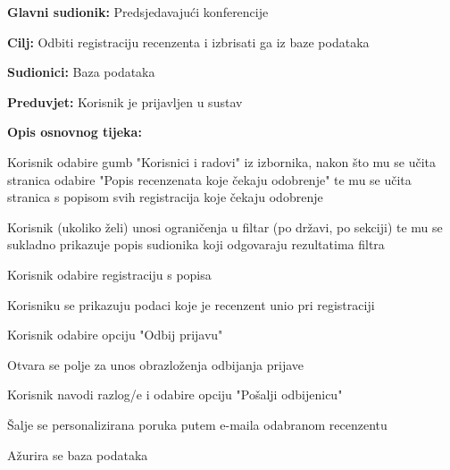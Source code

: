 					\noindent {}
					\begin{packed_item}
	
						\item \textbf{Glavni sudionik: } Predsjedavajući konferencije
						\item  \textbf{Cilj:} Odbiti registraciju recenzenta i izbrisati ga iz baze podataka
						\item  \textbf{Sudionici:} Baza podataka
						\item  \textbf{Preduvjet:} Korisnik je prijavljen u sustav
						\item  \textbf{Opis osnovnog tijeka:}
						
						\item[] \begin{packed_enum}

							\item Korisnik odabire gumb "Korisnici i radovi" iz izbornika, nakon što mu se učita stranica odabire "Popis recenzenata koje čekaju odobrenje" te mu se učita stranica s popisom svih registracija koje čekaju odobrenje
							\item Korisnik (ukoliko želi) unosi ograničenja u filtar (po državi, po sekciji) te mu se sukladno prikazuje popis sudionika koji odgovaraju rezultatima filtra
							\item Korisnik odabire registraciju s popisa
							\item Korisniku se prikazuju podaci koje je recenzent unio pri registraciji
							\item Korisnik odabire opciju "Odbij prijavu"
							\item Otvara se polje za unos obrazloženja odbijanja prijave
							\item Korisnik navodi razlog/e i odabire opciju "Pošalji odbijenicu"
							\item Šalje se personalizirana poruka putem e-maila odabranom recenzentu
							\item Ažurira se baza podataka

					
						\end{packed_enum}
			
					\end{packed_item}


